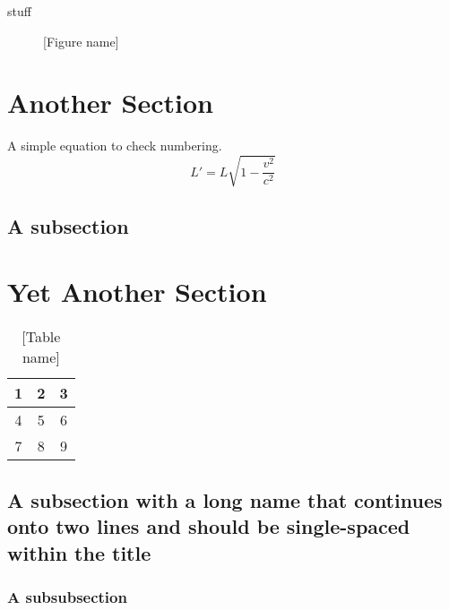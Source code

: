 stuff 
 
\lipsum[1-4] %

\begin{figure}
\framebox[\textwidth]{\parbox{\textwidth}{\lipsum[1]}} %
\caption[{[Alternate short name]}]{[Figure name]}
\end{figure}

\section{Another Section}
A simple equation to check numbering.
\begin{equation}
L' = {L}{\sqrt{1-\frac{v^2}{c^2}}}
\end{equation}
\lipsum[2-3] %

\subsection{A subsection}
\lipsum[5-6] %

\section{Yet Another Section}
\lipsum[1] %
\begin{table}
\begin{center}
\begin{tabular}{ | c | c | c | }
\hline
  1 & 2 & 3 \\ \hline\hline
  4 & 5 & 6 \\
  7 & 8 & 9 \\
\hline
\end{tabular}\vspace{-1em}%
\end{center}
\caption{[Table name]}
\end{table}
\lipsum[2]

\subsection{A subsection with a long name that continues onto two lines and should be single-spaced within the title}\label{sec:another}
\lipsum[3]

\subsubsection{A subsubsection}\label{sec:minorstuff}
\lipsum[4]



